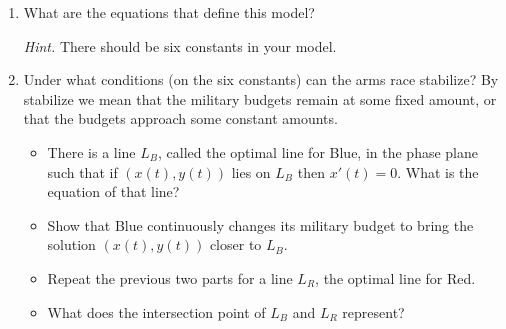 \begin{enumerate}[label=\emph{(\alph*)}]
\item What are the equations that define this model? 

\emph{Hint.} There should be six constants in your model.

\item Under what conditions (on the six constants) can the arms race stabilize? By stabilize we mean that the military budgets remain at some fixed amount, or that the budgets approach some constant amounts. 


\begin{itemize}
\item There is a line $L_B$, called the optimal line for Blue, in the phase plane such that if $(x(t),y(t))$ lies on $L_B$ then $x'(t)=0$. What is the equation of that line?

\item Show that Blue continuously changes its military budget to bring the solution $(x(t),y(t))$ closer to $L_B$.


\item Repeat the previous two parts for a line $L_R$, the optimal line for Red.


\item What does the intersection point of $L_B$ and $L_R$ represent?


\end{itemize}
\end{enumerate}
